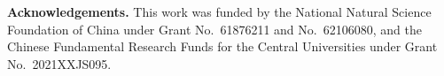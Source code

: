 \documentclass[10pt,twocolumn,letterpaper]{article}
\newcommand{\margin}{\vspace{3pt}\noindent}
\begin{document}
\margin
\noindent \textbf{Acknowledgements.} This work was funded by the National Natural Science Foundation of China under Grant No.~61876211 and No.~62106080, and the Chinese Fundamental Research Funds for the Central Universities 
under Grant No.~2021XXJS095.



{\small


}
\end{document}
